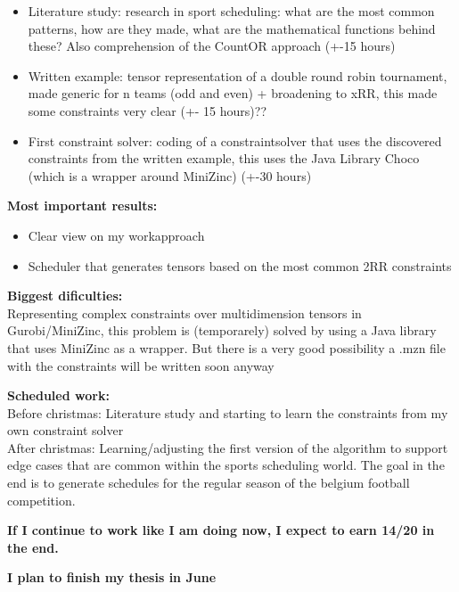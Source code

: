 \documentclass[12pt]{report}
\begin{document}
\begin{itemize}
\item Literature study: research in sport scheduling: what are the most common patterns, how are they made, what are the mathematical functions behind these? Also comprehension of the CountOR approach (+-15 hours)

\item Written example: tensor representation of a double round robin tournament, made generic for n teams (odd and even) + broadening to xRR, this made some constraints very clear (+- 15 hours)??

\item First constraint solver: coding of a constraintsolver that uses the discovered constraints from the written example, this uses the Java Library Choco (which is a wrapper around MiniZinc) (+-30 hours)
 
\end{itemize}
 
 
\vspace{1cm}
{\bf Most important results:}
\begin{itemize}
\item Clear view on my workapproach
\item Scheduler that generates tensors based on the most common 2RR constraints
\end{itemize}

\vspace{0.5cm}
{\bf Biggest dificulties:} \\
Representing complex constraints over multidimension tensors in Gurobi/MiniZinc, this problem is (temporarely) solved by using a Java library that uses MiniZinc as a wrapper. But there is a very good possibility a .mzn file with the constraints will be written soon anyway

\vspace{1cm}
{\bf Scheduled work:} \\
Before christmas: Literature study and starting to learn the constraints from my own constraint solver \\
After christmas: Learning/adjusting the first version of the algorithm to support edge cases that are common within the sports scheduling world. The goal in the end is to generate schedules for the regular season of the belgium football competition.


\vspace{0.5cm}
{\bf If I continue to work like I am doing now, I expect to earn 14/20 in the end.}

{\bf I plan to finish my thesis in June} 
\end{document}
